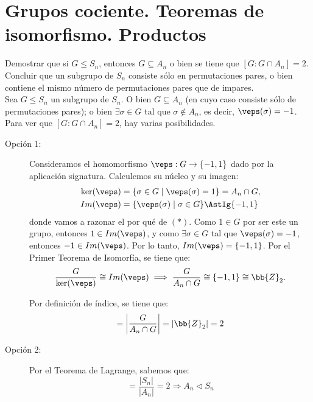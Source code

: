 \chapter{Grupos cociente. Teoremas de isomorfismo. Productos}

\begin{ejercicio}
    Demostrar que si $G\leq S_n$, entonces $G\subseteq A_n$ o bien se tiene que $[G:G\cap A_n]=2$. Concluir que un subgrupo de $S_n$ consiste sólo en permutaciones pares, o bien contiene el mismo número de permutaciones pares que de impares.\\

    Sea $G\leq S_n$ un subgrupo de $S_n$. O bien $G\subseteq A_n$ (en cuyo caso consiste sólo de permutaciones pares); o bien $\exists \sigma\in G$ tal que $\sigma\notin A_n$, es decir, $\veps(\sigma)=-1$.
    Para ver que $[G:G\cap A_n]=2$, hay varias posibilidades.
    \begin{description}
        \item[Opción 1:] Consideramos el homomorfismo $\veps:G\to \{-1,1\}$ dado por la aplicación signatura. Calculemos su núcleo y su imagen:
        \begin{align*}
            \ker(\veps) &= \{\sigma\in G\mid \veps(\sigma)=1\} = A_n\cap G,\\
            Im(\veps) &= \{\veps(\sigma)\mid \sigma\in G\}\AstIg \{-1,1\}
        \end{align*}
        donde vamos a razonar el por qué de $(\ast)$.
        Como $1\in G$ por ser este un grupo, entonces $1\in Im(\veps)$, y como $\exists \sigma\in G$ tal que $\veps(\sigma)=-1$, entonces $-1\in Im(\veps)$. Por lo tanto, $Im(\veps)=\{-1,1\}$. Por el Primer Teorema de Isomorfía, se tiene que:
        \begin{equation*}
            \frac{G}{\ker(\veps)}\cong Im(\veps) \implies \frac{G}{A_n\cap G}\cong \{-1,1\}\cong \bb{Z}_2.
        \end{equation*}

        Por definición de índice, se tiene que:
        \begin{equation*}
            [G:A_n\cap G] = \left|\dfrac{G}{A_n\cap G}\right| = |\bb{Z}_2| = 2
        \end{equation*}

        \item[Opción 2:] Por el Teorema de Lagrange, sabemos que:
        \begin{equation*}
            [S_n : A_n] = \dfrac{|S_n|}{|A_n|} = 2\Longrightarrow A_n \lhd S_n
        \end{equation*}


\end{description}
\end{ejercicio}
